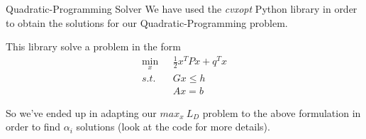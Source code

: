 \begin{frame}[fragile]{Quadratic-Programming Solver}
  We have used the \emph{cvxopt} Python library in order to obtain the 
  solutions for our Quadratic-Programming problem.
  \vspace{.5cm}

  This library solve a problem in the form
  \begin{equation*}
    \begin{split}
      \min_{x}\ &\ \ \frac{1}{2} x^T P x + q^T x \\
          s.t.\ &\ \ Gx \leq h \\
              \ &\ \ Ax = b
    \end{split}
  \end{equation*}
  \vspace{.5cm}

  So we've ended up in adapting our $max_{x}\ L_D$ problem to the above formulation
  in order to find $\alpha_i$ solutions (look at the code for more details).
\end{frame}
